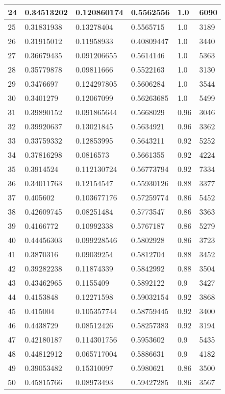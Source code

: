 \begin{longtable}{|l|l|l|l|l|l|}
24 & 0.34513202 & 0.120860174 & 0.5562556 & 1.0 & 6090 \\ \hline 
25 & 0.31831938 & 0.13278404 & 0.5565715 & 1.0 & 3189 \\ \hline 
26 & 0.31915012 & 0.11958933 & 0.40809447 & 1.0 & 3440 \\ \hline 
27 & 0.36679435 & 0.091206655 & 0.5614146 & 1.0 & 5363 \\ \hline 
28 & 0.35779878 & 0.09811666 & 0.5522163 & 1.0 & 3130 \\ \hline 
29 & 0.3476697 & 0.124297805 & 0.5606284 & 1.0 & 3544 \\ \hline 
30 & 0.3401279 & 0.12067099 & 0.56263685 & 1.0 & 5499 \\ \hline 
31 & 0.39890152 & 0.091865644 & 0.5668029 & 0.96 & 3046 \\ \hline 
32 & 0.39920637 & 0.13021845 & 0.5634921 & 0.96 & 3362 \\ \hline 
33 & 0.33759332 & 0.12853995 & 0.5643211 & 0.92 & 5252 \\ \hline 
34 & 0.37816298 & 0.0816573 & 0.5661355 & 0.92 & 4224 \\ \hline 
35 & 0.3914524 & 0.112130724 & 0.56773794 & 0.92 & 7334 \\ \hline 
36 & 0.34011763 & 0.12154547 & 0.55930126 & 0.88 & 3377 \\ \hline 
37 & 0.405602 & 0.103677176 & 0.57259774 & 0.86 & 5452 \\ \hline 
38 & 0.42609745 & 0.08251484 & 0.5773547 & 0.86 & 3363 \\ \hline 
39 & 0.4166772 & 0.10992338 & 0.5767187 & 0.86 & 5279 \\ \hline 
40 & 0.44456303 & 0.099228546 & 0.5802928 & 0.86 & 3723 \\ \hline 
41 & 0.3870316 & 0.09039254 & 0.5812704 & 0.88 & 3452 \\ \hline 
42 & 0.39282238 & 0.11874339 & 0.5842992 & 0.88 & 3504 \\ \hline 
43 & 0.43462965 & 0.1155409 & 0.5892122 & 0.9 & 3427 \\ \hline 
44 & 0.4153848 & 0.12271598 & 0.59032154 & 0.92 & 3868 \\ \hline 
45 & 0.415004 & 0.105357744 & 0.58759445 & 0.92 & 3400 \\ \hline 
46 & 0.4438729 & 0.08512426 & 0.58257383 & 0.92 & 3194 \\ \hline 
47 & 0.42180187 & 0.114301756 & 0.5953602 & 0.9 & 5435 \\ \hline 
48 & 0.44812912 & 0.065717004 & 0.5886631 & 0.9 & 4182 \\ \hline 
49 & 0.39053482 & 0.15310097 & 0.5980621 & 0.86 & 3500 \\ \hline 
50 & 0.45815766 & 0.08973493 & 0.59427285 & 0.86 & 3567 \\ \hline 
\end{longtable}